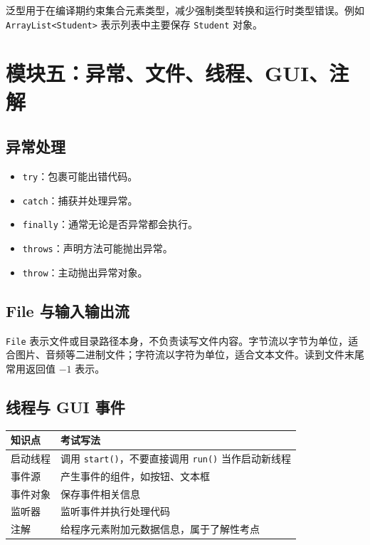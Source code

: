 \documentclass[UTF8,zihao=-4]{ctexart}
\begin{document}
\begin{keybox}[泛型]
泛型用于在编译期约束集合元素类型，减少强制类型转换和运行时类型错误。例如 \texttt{ArrayList<Student>} 表示列表中主要保存 \texttt{Student} 对象。
\end{keybox}

\section{模块五：异常、文件、线程、GUI、注解}

\subsection{异常处理}
\begin{keybox}[异常关键字]
\begin{itemize}
  \item \texttt{try}：包裹可能出错代码。
  \item \texttt{catch}：捕获并处理异常。
  \item \texttt{finally}：通常无论是否异常都会执行。
  \item \texttt{throws}：声明方法可能抛出异常。
  \item \texttt{throw}：主动抛出异常对象。
\end{itemize}
\end{keybox}

\subsection{File 与输入输出流}
\begin{keybox}[区别]
\texttt{File} 表示文件或目录路径本身，不负责读写文件内容。字节流以字节为单位，适合图片、音频等二进制文件；字符流以字符为单位，适合文本文件。读到文件末尾常用返回值 $-1$ 表示。
\end{keybox}

\subsection{线程与 GUI 事件}
\begin{longtable}{p{}p{}}
\toprule
\textbf{知识点} & \textbf{考试写法} \\
\midrule
启动线程 & 调用 \texttt{start()}，不要直接调用 \texttt{run()} 当作启动新线程 \\
事件源 & 产生事件的组件，如按钮、文本框 \\
事件对象 & 保存事件相关信息 \\
监听器 & 监听事件并执行处理代码 \\
注解 & 给程序元素附加元数据信息，属于了解性考点 \\
\bottomrule
\end{longtable}
\end{document}
